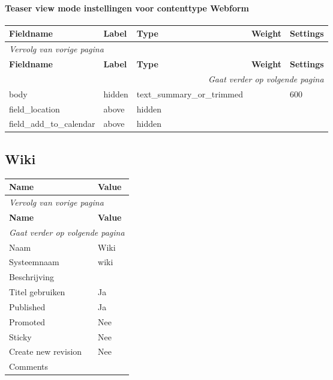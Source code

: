 \paragraph{Teaser view mode instellingen voor contenttype Webform }

  \begin{longtable}{| p{3.00cm}|p{3.00cm}|p{3.00cm}|p{3.00cm}|p{3.00cm}|}
  \hline
  \rowcolor{tableheader}
  \textbf{Fieldname} & \textbf{Label} & \textbf{Type} & \textbf{Weight} & \textbf{Settings}  \tabularnewline
  \hline
\endfirsthead
\multicolumn{5}{l}{\textit{Vervolg van vorige pagina}} \\
\hline
\rowcolor{tableheader}
  \textbf{Fieldname} & \textbf{Label} & \textbf{Type} & \textbf{Weight} & \textbf{Settings}  \tabularnewline
  \hline
\hline
\endhead
\multicolumn{5}{r}{\textit{Gaat verder op volgende pagina}} \\
\endfoot
\hline
\endlastfoot
  body & hidden & text\_summary\_or\_trimmed &   & 600  \tabularnewline
  \hline
  field\_location & above & hidden &   &    \tabularnewline
  \hline
  field\_add\_to\_calendar & above & hidden &   &    \tabularnewline
  \hline
  \end{longtable}

\subsection{Wiki}
\label{sec:content-wiki}
  \begin{longtable}{| p{7.50cm}|p{7.50cm}|}
  \hline
  \rowcolor{tableheader}
  \textbf{Name} & \textbf{Value}  \tabularnewline
  \hline
\endfirsthead
\multicolumn{2}{l}{\textit{Vervolg van vorige pagina}} \\
\hline
\rowcolor{tableheader}
  \textbf{Name} & \textbf{Value}  \tabularnewline
  \hline
\hline
\endhead
\multicolumn{2}{r}{\textit{Gaat verder op volgende pagina}} \\
\endfoot
\hline
\endlastfoot
  Naam & Wiki  \tabularnewline
  \hline
  Systeemnaam & wiki  \tabularnewline
  \hline
  Beschrijving &   \tabularnewline
  \hline
  Titel gebruiken & Ja  \tabularnewline
  \hline
  Published & Ja  \tabularnewline
  \hline
  Promoted & Nee  \tabularnewline
  \hline
  Sticky & Nee  \tabularnewline
  \hline
  Create new revision & Nee  \tabularnewline
  \hline
  Comments &   \tabularnewline
  \hline
  \end{longtable}


